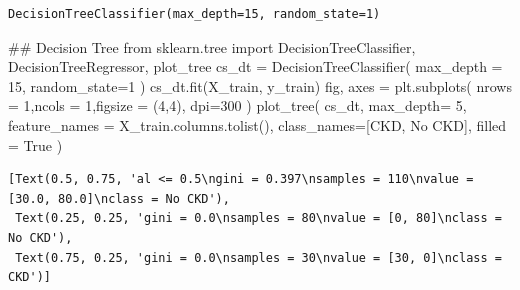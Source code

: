 \documentclass[
  11pt,
  letterpaper,
  DIV=11,
  numbers=noendperiod]{scrartcl}
\newenvironment{Shaded}{\begin{snugshade}}{\end{snugshade}}
\newcommand{\CommentTok}[1]{\textcolor[rgb]{0.37,0.37,0.37}{#1}}
\newcommand{\DecValTok}[1]{\textcolor[rgb]{0.68,0.00,0.00}{#1}}
\newcommand{\ImportTok}[1]{\textcolor[rgb]{0.00,0.46,0.62}{#1}}
\newcommand{\NormalTok}[1]{\textcolor[rgb]{0.00,0.23,0.31}{#1}}
\newcommand{\OperatorTok}[1]{\textcolor[rgb]{0.37,0.37,0.37}{#1}}
\newcommand{\StringTok}[1]{\textcolor[rgb]{0.13,0.47,0.30}{#1}}
\newcommand{\VariableTok}[1]{\textcolor[rgb]{0.07,0.07,0.07}{#1}}
\begin{document}
\begin{verbatim}
DecisionTreeClassifier(max_depth=15, random_state=1)
\end{verbatim}

\begin{Shaded}
\begin{Highlighting}[]
\CommentTok{\#\# Decision Tree}
\ImportTok{from}\NormalTok{ sklearn.tree }\ImportTok{import}\NormalTok{ DecisionTreeClassifier, DecisionTreeRegressor, plot\_tree}
\NormalTok{cs\_dt }\OperatorTok{=}\NormalTok{ DecisionTreeClassifier(}
\NormalTok{    max\_depth }\OperatorTok{=} \DecValTok{15}\NormalTok{,}
\NormalTok{    random\_state}\OperatorTok{=}\DecValTok{1}
\NormalTok{    ) }
\NormalTok{cs\_dt.fit(X\_train, y\_train)}
\NormalTok{fig, axes }\OperatorTok{=}\NormalTok{ plt.subplots(}
\NormalTok{    nrows }\OperatorTok{=} \DecValTok{1}\NormalTok{,ncols }\OperatorTok{=} \DecValTok{1}\NormalTok{,figsize }\OperatorTok{=}\NormalTok{ (}\DecValTok{4}\NormalTok{,}\DecValTok{4}\NormalTok{), dpi}\OperatorTok{=}\DecValTok{300}
\NormalTok{    )}
\NormalTok{plot\_tree(}
\NormalTok{    cs\_dt, }
\NormalTok{    max\_depth}\OperatorTok{=} \DecValTok{5}\NormalTok{, }
\NormalTok{    feature\_names }\OperatorTok{=}\NormalTok{ X\_train.columns.tolist(), }
\NormalTok{    class\_names}\OperatorTok{=}\NormalTok{[}\StringTok{\textquotesingle{}CKD\textquotesingle{}}\NormalTok{, }\StringTok{\textquotesingle{}No CKD\textquotesingle{}}\NormalTok{], }
\NormalTok{    filled }\OperatorTok{=} \VariableTok{True}
\NormalTok{    )}
\end{Highlighting}
\end{Shaded}

\begin{verbatim}
[Text(0.5, 0.75, 'al <= 0.5\ngini = 0.397\nsamples = 110\nvalue = [30.0, 80.0]\nclass = No CKD'),
 Text(0.25, 0.25, 'gini = 0.0\nsamples = 80\nvalue = [0, 80]\nclass = No CKD'),
 Text(0.75, 0.25, 'gini = 0.0\nsamples = 30\nvalue = [30, 0]\nclass = CKD')]
\end{verbatim}
\end{document}
